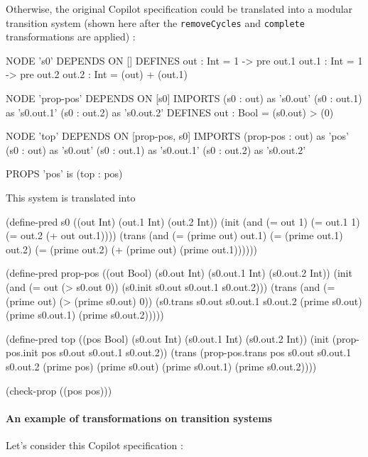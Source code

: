 \bigskip

Otherwise, the original Copilot specification could be translated into a modular transition system (shown here after the \texttt{removeCycles} and \texttt{complete} transformations are applied) :
\begin{code}
NODE 's0' DEPENDS ON []
DEFINES
    out : Int =
        1 -> pre out.1
    out.1 : Int =
        1 -> pre out.2
    out.2 : Int =
        (out) + (out.1)

NODE 'prop-pos' DEPENDS ON [s0]
IMPORTS
    (s0 : out) as 's0.out'
    (s0 : out.1) as 's0.out.1'
    (s0 : out.2) as 's0.out.2'
DEFINES
    out : Bool =
        (s0.out) > (0)

NODE 'top' DEPENDS ON [prop-pos, s0]
IMPORTS
    (prop-pos : out) as 'pos'
    (s0 : out) as 's0.out'
    (s0 : out.1) as 's0.out.1'
    (s0 : out.2) as 's0.out.2'

PROPS
'pos' is (top : pos)
\end{code}
This system is translated into 

\begin{code}
(define-pred s0
  ((out Int)
   (out.1 Int)
   (out.2 Int))
  (init
    (and
      (= out 1)
      (= out.1 1)
      (= out.2
        (+ out out.1))))
  (trans
    (and
      (= (prime out) out.1)
      (= (prime out.1) out.2)
      (= (prime out.2)
        (+ (prime out) (prime out.1))))))

(define-pred prop-pos
  ((out Bool)
   (s0.out Int)
   (s0.out.1 Int)
   (s0.out.2 Int))
  (init
    (and
      (= out
        (> s0.out 0))
      (s0.init s0.out s0.out.1 s0.out.2)))
  (trans
    (and
      (= (prime out)
        (> (prime s0.out) 0))
      (s0.trans s0.out s0.out.1 s0.out.2 (prime s0.out) (prime s0.out.1) (prime s0.out.2)))))

(define-pred top
  ((pos Bool)
   (s0.out Int)
   (s0.out.1 Int)
   (s0.out.2 Int))
  (init
    (prop-pos.init pos s0.out s0.out.1 s0.out.2))
  (trans
    (prop-pos.trans pos s0.out s0.out.1 s0.out.2 (prime pos) (prime s0.out) (prime s0.out.1) (prime s0.out.2))))

(check-prop
  ((pos pos)))
\end{code}



\paragraph{An example of transformations on transition systems}


Let's consider this Copilot specification : 


